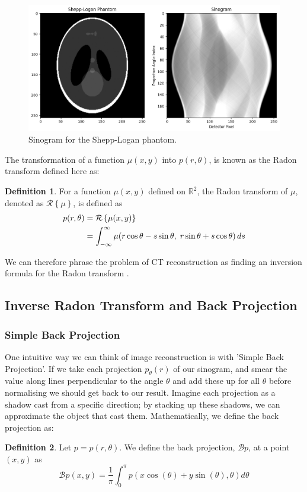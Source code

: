 \documentclass{article}
\theoremstyle{definition}
\newtheorem{definition}{Definition}[section]
\begin{document}
\begin{figure}[H]
	\includegraphics[scale=0.5]{sinogramshepp.png}
	\caption{Sinogram for the Shepp-Logan phantom.}
	\label{fig:sinogramshepp}
\end{figure}

The transformation of a function $\mu (x,y)$ into $p(r, \theta)$, is known as the Radon transform defined here as:
\begin{definition}
For a function $\mu(x,y)$ defined on $\mathbb{R}^2$, the Radon transform of $\mu$, denoted as $\mathcal{R}\left\{\mu \right\}$, is defined as
\begin{align*}
p(r, \theta) &= \mathcal{R} \left\{ \mu(x,y) \right\} \notag \\
             &= \int_{-\infty}^{\infty} \mu(r \cos\theta - s \sin\theta,\; r \sin\theta + s \cos\theta) \, ds
\end{align*}
\label{radon}
\end{definition}
We can therefore phrase the problem of CT reconstruction as finding an inversion formula for the Radon transform \cite{Beatty2012}. 

\subsection{Inverse Radon Transform and Back Projection}
\subsubsection{Simple Back Projection}
One intuitive way we can think of image reconstruction is with 'Simple Back Projection'. If we take each projection $p_\theta (r)$ of our sinogram, and smear the value along lines perpendicular to the angle $\theta$ and add these up for all $\theta$ before normalising we should get back to our result. Imagine each projection as a shadow cast from a specific direction; by stacking up these shadows, we can approximate the object that cast them.
Mathematically, we define the back projection as:
\begin{definition}
Let $p = p(r, \theta)$. We define the back projection, $\mathcal{B} p$, at a point $(x,y)$ as
$$
\mathcal{B} p(x,y) = \frac{1}{\pi} \int_{0}^{\pi} p(x \cos(\theta) + y \sin(\theta), \theta) d\theta
$$
\label{backprojection}
\end{definition}
\end{document}
